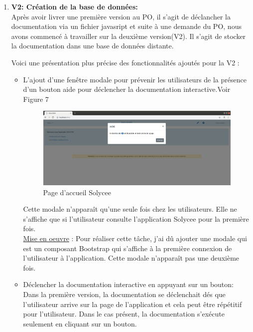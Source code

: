\documentclass[12pt]{article}
\begin{document}
\begin{enumerate}
\item \textbf{V2: Création de la base de données: }\\

Après avoir livrer une première version au PO, il s'agit de déclancher la documentation via un fichier javasript et suite à une demande du PO, nous avons commencé à travailler sur la deuxième version(V2). Il s'agit de stocker la documentation dans une base de données distante. 

Voici une présentation plus précise des fonctionnalités ajoutés pour la V2 :

\begin{itemize}
\item  L'ajout d'une fenêtre modale pour prévenir les utilisateurs de la présence d'un bouton aide pour déclencher la documentation interactive.Voir Figure 7

\begin{figure}[H]
	\centering
 		\includegraphics[width=1\textwidth]{diagrammes/aide_modal.png}
  		\caption{Page d'accueil Solycee}
	\end{figure}
Cette modale n'apparaît qu'une seule fois chez les utilisateurs. Elle ne s'affiche que si l'utilisateur consulte l'application Solycee pour la première fois. \\ 


\underline{Mise en oeuvre} :
Pour réaliser cette tâche, j'ai dû ajouter une modale qui est un composant Bootstrap qui s'affiche à la première connexion de l'utilisateur à l'application. Cette modale n'apparaît pas une deuxième fois. \\ 

   
\item  Déclencher la documentation interactive en appuyant sur un bouton: Dans la première version, la documentation se déclenchait dés que l'utilisateur arrive sur la page de l'application et cela peut être répétitif pour l'utilisateur. Dans le cas présent, la documentation s'exécute seulement en cliquant sur un bouton. \\ 


\end{itemize}
\end{enumerate}
\end{document}
